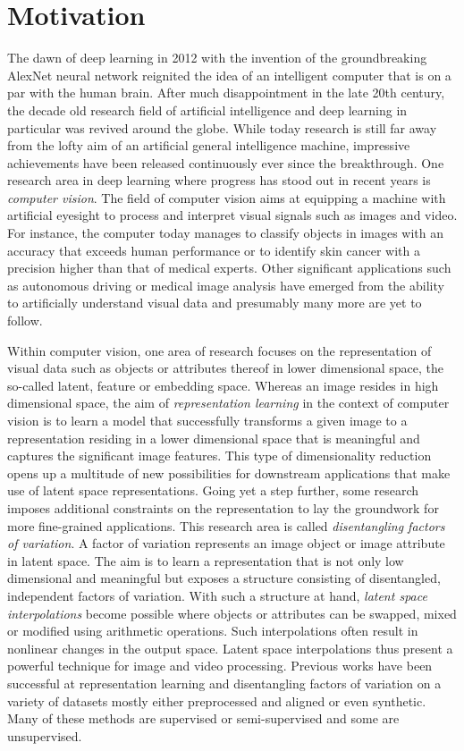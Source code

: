 \documentclass[a4paper,12pt]{report}
\begin{document}
\section{Motivation}
The dawn of deep learning in 2012 with the invention of the groundbreaking AlexNet neural network reignited the idea of an intelligent computer that is on a par with the human brain. After much disappointment in the late 20th century, the decade old research field of artificial intelligence and deep learning in particular was revived around the globe. While today research is still far away from the lofty aim of an artificial general intelligence machine, impressive achievements have been released continuously ever since the breakthrough. One research area in deep learning where progress has stood out in recent years is \textit{computer vision}. The field of computer vision aims at equipping a machine with artificial eyesight to process and interpret visual signals such as images and video. For instance, the computer today manages to classify objects in images with an accuracy that exceeds human performance or to identify skin cancer with a precision higher than that of medical experts. Other significant applications such as autonomous driving or medical image analysis have emerged from the ability to artificially understand visual data and presumably many more are yet to follow. 

Within computer vision, one area of research focuses on the representation of visual data such as objects or attributes thereof in lower dimensional space, the so-called latent, feature or embedding space. Whereas an image resides in high dimensional space, the aim of \textit{representation learning} in the context of computer vision is to learn a model that successfully transforms a given image to a representation residing in a lower dimensional space that is meaningful and captures the significant image features. This type of dimensionality reduction opens up a multitude of new possibilities for downstream applications that make use of latent space representations. Going yet a step further, some research imposes additional constraints on the representation to lay the groundwork for more fine-grained applications. This research area is called \textit{disentangling factors of variation}. A factor of variation represents an image object or image attribute in latent space. The aim is to learn a representation that is not only low dimensional and meaningful but exposes a structure consisting of disentangled, independent factors of variation. With such a structure at hand, \textit{latent space interpolations} become possible where objects or attributes can be swapped, mixed or modified using arithmetic operations. Such interpolations often result in nonlinear changes in the output space. Latent space interpolations thus present a powerful technique for image and video processing. Previous works have been successful at representation learning and disentangling factors of variation on a variety of datasets mostly either preprocessed and aligned or even synthetic. Many of these methods are supervised or semi-supervised and some are unsupervised.
\end{document}
